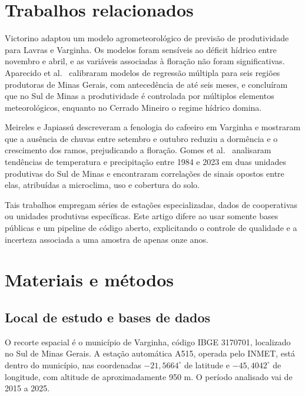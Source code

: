 \documentclass{RITA}
\begin{document}
\section{Trabalhos relacionados}

Victorino \cite{victorino2015} adaptou um modelo agrometeorol\'ogico de previs\~ao de produtividade para Lavras e Varginha. Os modelos foram sens\'iveis ao d\'eficit h\'idrico entre novembro e abril, e as vari\'aveis associadas \`a flora\c{c}\~ao n\~ao foram significativas. Aparecido et al.\ \cite{aparecido2016} calibraram modelos de regress\~ao m\'ultipla para seis regi\~oes produtoras de Minas Gerais, com anteced\^encia de at\'e seis meses, e conclu\'iram que no Sul de Minas a produtividade \'e controlada por m\'ultiplos elementos meteorol\'ogicos, enquanto no Cerrado Mineiro o regime h\'idrico domina.

Meireles e Japiass\'u \cite{meireles2009} descreveram a fenologia do cafeeiro em Varginha e mostraram que a aus\^encia de chuvas entre setembro e outubro reduziu a dorm\^encia e o crescimento dos ramos, prejudicando a flora\c{c}\~ao. Gomes et al.\ \cite{gomes2026} analisaram tend\^encias de temperatura e precipita\c{c}\~ao entre 1984 e 2023 em duas unidades produtivas do Sul de Minas e encontraram correla\c{c}\~oes de sinais opostos entre elas, atribu\'idas a microclima, uso e cobertura do solo.

Tais trabalhos empregam s\'eries de esta\c{c}\~oes especializadas, dados de cooperativas ou unidades produtivas espec\'ificas. Este artigo difere ao usar somente bases p\'ublicas e um pipeline de c\'odigo aberto, explicitando o controle de qualidade e a incerteza associada a uma amostra de apenas onze anos.

\section{Materiais e m\'etodos}

\subsection{Local de estudo e bases de dados}

O recorte espacial \'e o munic\'ipio de Varginha, c\'odigo IBGE 3170701, localizado no Sul de Minas Gerais. A esta\c{c}\~ao autom\'atica A515, operada pelo INMET, est\'a dentro do munic\'ipio, nas coordenadas $-21{,}5664^\circ$ de latitude e $-45{,}4042^\circ$ de longitude, com altitude de aproximadamente 950 m. O per\'iodo analisado vai de 2015 a 2025.
\end{document}
